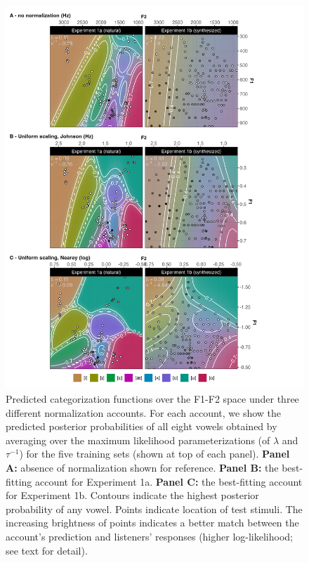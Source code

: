 \documentclass[preprint]{JASA}
\begin{document}
\begin{figure}[!ht]

{\centering \includegraphics[width=0.8\linewidth]{../../figures/p.prediction-landscapes-study1} 

}

\caption{Predicted categorization functions over the F1-F2 space under three different normalization accounts. For each account, we show the predicted posterior probabilities of all eight vowels obtained by averaging over the maximum likelihood parameterizations (of \(\lambda\) and \(\tau^{-1}\)) for the five training sets (shown at top of each panel). \textbf{Panel A:} absence of normalization shown for reference. \textbf{Panel B:} the best-fitting account for Experiment 1a. \textbf{Panel C:} the best-fitting account for Experiment 1b. Contours indicate the highest posterior probability of any vowel. Points indicate location of test stimuli. The increasing brightness of points indicates a better match between the account's prediction and listeners' responses (higher log-likelihood; see text for detail).}\label{fig:prediction-landscapes-optim-io}
\end{figure}
\end{document}
